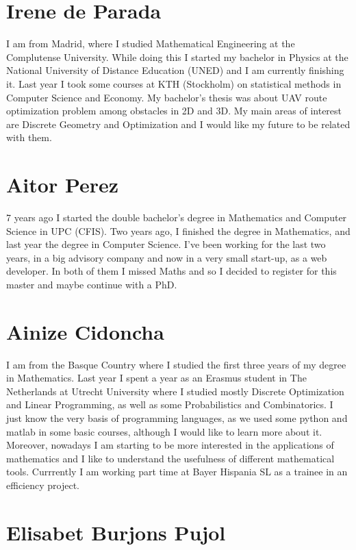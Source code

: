 \documentclass[11pt]{amsart}
\begin{document}
\section*{Irene de Parada}

I am from Madrid, where I studied Mathematical Engineering at the Complutense University. While doing this I started my bachelor in Physics  at the National University of Distance Education (UNED) and I am currently finishing it. Last year I took some courses at KTH (Stockholm) on statistical methods in Computer Science and Economy. My  bachelor's thesis was about UAV route optimization problem  among obstacles in 2D and 3D. My main areas of interest are Discrete Geometry and Optimization and I would like my future to be related with them.

\section*{Aitor Perez}
7 years ago I started the double bachelor's degree in Mathematics and Computer Science in UPC (CFIS). Two years ago, I finished the degree in Mathematics, and last year the degree in Computer Science. I've been working for the last two years, in a big advisory company and now in a very small start-up, as a web developer. In both of them I missed Maths and so I decided to register for this master and maybe continue with a PhD.

\section*{Ainize Cidoncha}
I am from the Basque Country where I studied the first three years of my degree in Mathematics. Last year I spent a year as an Erasmus student in The Netherlands at Utrecht University where I studied mostly Discrete Optimization and Linear Programming, as well as some Probabilistics and Combinatorics.
I just know the very basis of programming languages, as we used some python and matlab in some basic courses, although I would like to learn more about it. Moreover, nowadays I am starting to be more interested in the applications of mathematics and I like to understand the usefulness of different mathematical tools. 
Currrently I am working part time at Bayer Hispania SL as a trainee in an efficiency project.

\section*{Elisabet Burjons Pujol}
\end{document}

